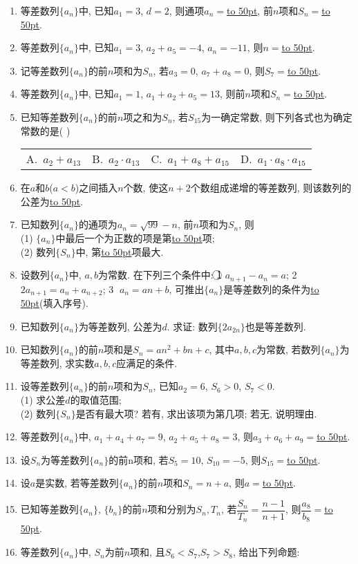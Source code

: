 \documentclass[10pt,a4paper]{article}
\newcommand{\blank}[1]{\underline{\hbox to #1pt{}}}
\newcommand{\fourch}[4]{\par\begin{tabular}{p{.23\textwidth}p{.23\textwidth}p{.23\textwidth}p{.23\textwidth}}
A.~#1 &B.~#2& C.~#3& D.~#4
\end{tabular}}
\begin{document}
\begin{enumerate}[1.]
\item 等差数列$\{a_n\}$中, 已知$a_1=3$, $d=2$, 则通项$a_n=$\blank{50}, 前$n$项和$S_n=$\blank{50}.
\item 等差数列$\{a_n\}$中, 已知$a_1=3$, $a_2+a_5=-4$, $a_n=-11$, 则$n=$\blank{50}.
\item 记等差数列$\{a_n\}$的前$n$项和为$S_n$, 若$a_3=0$, $a_7+a_8=0$, 则$S_7=$\blank{50}.
\item 等差数列$\{a_n\}$中, 已知$a_1=1$, $a_1+a_2+a_5=13$, 则前$n$项和$S_n=$\blank{50}.
\item 已知等差数列$\{a_n\}$的前$n$项之和为$S_n$, 若$S_{15}$为一确定常数, 则下列各式也为确定常数的是(  )
\fourch{$a_2+a_{13}$}{$a_2\cdot a_{13}$}{$a_1+a_8+a_{15}$}{$a_1\cdot a_8\cdot a_{15}$}
\item 在$a$和$b$($a<b$)之间插入$n$个数, 使这$n+2$个数组成递增的等差数列, 则该数列的公差为\blank{50}.
\item 已知数列$\{a_n\}$的通项为$a_n=\sqrt{99}-n$, 前$n$项和为$S_n$, 则\\
(1) $\{a_n\}$中最后一个为正数的项是第\blank{50}项;\\
(2) 数列$\{S_n\}$中, 第\blank{50}项最大.
\item 设数列$\{a_n\}$中, $a,b$为常数. 在下列三个条件中: \textcircled{1} $a_{n+1}-a_n=a$; \textcircled{2} $2a_{n+1}=a_n+a_{n+2}$; \textcircled{3} $a_n=an+b$, 可推出$\{a_n\}$是等差数列的条件为\blank{50}(填入序号).
\item 已知数列$\{a_n\}$为等差数列, 公差为$d$. 求证: 数列$\{2a_{2n}\}$也是等差数列.
\item 已知数列$\{a_n\}$的前$n$项和是$S_n=an^2+bn+c$, 其中$a,b,c$为常数, 若数列$\{a_n\}$为等差数列, 求实数$a,b,c$应满足的条件.
\item 设等差数列$\{a_n\}$的前$n$项和为$S_n$, 已知$a_2=6$, $S_6>0$, $S_7<0$.\\
(1) 求公差$d$的取值范围;\\
(2) 数列$\{S_n\}$是否有最大项? 若有, 求出该项为第几项; 若无, 说明理由.
\item 等差数列$\{a_n\}$中, $a_1+a_4+a_7=9$, $a_2+a_5+a_8=3$, 则$a_3+a_6+a_9=$\blank{50}.
\item 设$S_n$为等差数列$\{a_n\}$的前n项和, 若$S_5=10$, $S_{10}=-5$, 则$S_{15}=$\blank{50}.
\item 设$a$是实数, 若等差数列$\{a_n\}$的前$n$项和$S_n=n+a$, 则$a=$\blank{50}.
\item 已知等差数列$\{a_n\}$, $\{b_n\}$的前$n$项和分别为$S_n,T_n$, 若$\dfrac{S_n}{T_n}=\dfrac{n-1}{n+1}$, 则$\dfrac{a_8}{b_8}=$\blank{50}.
\item 等差数列$\{a_n\}$中, $S_n$为前$n$项和, 且$S_6<S_7$,$S_7>S_8$, 给出下列命题:\\

\end{enumerate}
\end{document}
